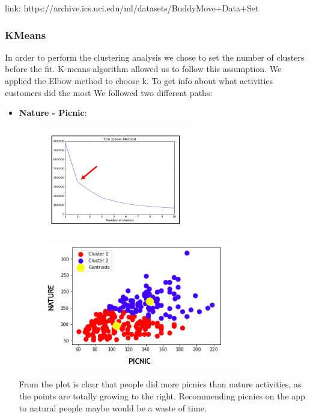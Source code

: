 link: https://archive.ics.uci.edu/ml/datasets/BuddyMove+Data+Set


\newpage
\subsubsection{KMeans}
In order to perform the clustering analysis we chose to set the number of clusters before the fit. K-means algorithm allowed us to follow this assumption. We applied the Elbow method to choose k. To get info about what activities customers did the most We followed two different paths: 

\begin{itemize}
\item \textbf{Nature - Picnic}:

\begin{figure}[H]
\centering
\includegraphics[width=0.6\textwidth]{Img/2_elbow.png}
\end{figure}

\begin{figure}[H]
\centering
\includegraphics[width=0.8\textwidth]{Img/2_cluster.png}
\end{figure}

From the plot is clear that people did more picnics than nature activities, as the points are totally growing to the right. Recommending picnics on the app to natural people maybe would be a waste of time.


\end{itemize}
